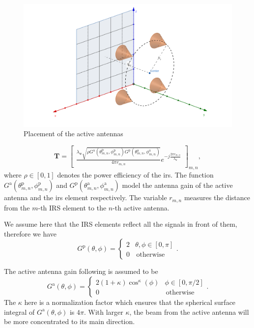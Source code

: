 \documentclass[12pt,draftclsnofoot,onecolumn,journal]{IEEEtran}
\begin{document}
\begin{figure}[htbp]
\includegraphics[width=5in]{posantenna.png} 
\caption{Placement of the active antennas} \label{fig:activeantepos}
\end{figure}
\begin{equation}
\mathbf T=\begin{bmatrix}
\frac{\lambda_{\mathrm w}\sqrt{\rho G^{\mathrm a}(\theta^{\mathrm p}_{m,n}, \phi^{\mathrm p}_{m,n})G^{\mathrm p}(\theta^{\mathrm a}_{m,n}, \phi^{\mathrm a}_{m,n})}}{4\pi r_{m,n}}e^{-j\frac{2\pi r_{m,n}}{\lambda_{\mathrm w}}}
\end{bmatrix}_{m,n},
\label{eq:illuminationbasic}
\end{equation}
where $\rho\in[0,1]$ denotes the power efficiency of the \ac{irs}. The function $G^{\mathrm a}(\theta^{\mathrm p}_{m,n}, \phi^{\mathrm p}_{m,n})$ and $G^{\mathrm p}(\theta^{\mathrm a}_{m,n}, \phi^{\mathrm a}_{m,n})$ model the antenna gain of the active antenna and the \ac{irs} element respectively. The variable $r_{m,n}$ measures the distance from the $m$-th IRS element to the $n$-th active antenna.


We assume here that the IRS elements reflect all the signals in front of them, therefore we have 
\begin{equation}
G^{\mathrm p}(\theta, \phi)=\begin{cases}
2 & \theta, \phi\in[0,\pi] \\
0 & \, \text{otherwise}
\end{cases}.
\end{equation}

The active antenna gain following \cite{jamali2020intelligent} is assumed to be 
\begin{equation}
G^{\mathrm a}(\theta, \phi)=\begin{cases}
2(1+\kappa)\cos^\kappa(\phi) & \phi\in[0,\pi/2] \\
0 & \, \text{otherwise}
\end{cases}.
\end{equation}
The $\kappa$ here is a normalization factor which ensures that the spherical surface integral of $G^{\mathrm a}(\theta, \phi)$ is $4\pi$. With larger $\kappa$, the beam from the active antenna will be more concentrated to its main direction.
\end{document}

